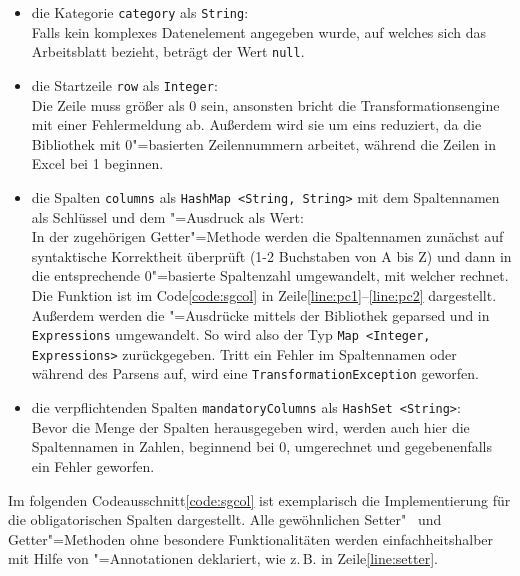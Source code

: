 \begin{itemize}
\item die Kategorie \texttt{category} als \texttt{String}:\\
Falls kein komplexes Datenelement angegeben wurde, auf welches sich das Arbeitsblatt bezieht, beträgt der Wert \texttt{null}. 
\item die Startzeile \texttt{row} als \texttt{Integer}:\\
Die Zeile muss größer als 0 sein, ansonsten bricht die Transformationsengine mit einer Fehlermeldung ab. Außerdem wird sie um eins reduziert, da die Bibliothek  mit 0"=basierten Zeilennummern arbeitet, während die Zeilen in Excel bei 1 beginnen. 
\item die Spalten \texttt{columns} als \texttt{HashMap <String, String>} mit dem Spaltennamen als Schlüssel und dem "=Ausdruck als Wert:\\
In der zugehörigen Getter"=Methode werden die Spaltennamen zunächst auf syntaktische Korrektheit überprüft (1-2 Buchstaben von A bis Z) und dann in die entsprechende 0"=basierte Spaltenzahl umgewandelt, mit welcher  rechnet. Die Funktion ist im Code\nbs\ref{code:sgcol} in Zeile\nbs\ref{line:pc1}--\nbs\ref{line:pc2} dargestellt. Außerdem werden die "=Ausdrücke mittels der Bibliothek  geparsed und in \texttt{Expressions} umgewandelt. So wird also der Typ \texttt{Map <Integer, Expressions>} zurückgegeben. Tritt ein Fehler im Spaltennamen oder während des  Parsens auf, wird eine \texttt{TransformationException} geworfen.
\item die verpflichtenden Spalten \texttt{mandatoryColumns} als \texttt{HashSet <String>}:\\
Bevor die Menge der Spalten herausgegeben wird, werden auch hier die Spaltennamen in Zahlen, beginnend bei 0, umgerechnet und gegebenenfalls ein Fehler geworfen.   
\end{itemize}
Im folgenden Codeausschnitt\nbs\ref{code:sgcol} ist exemplarisch die Implementierung für die obligatorischen Spalten dargestellt. Alle gewöhnlichen Setter"~ und Getter"=Methoden ohne besondere Funktionalitäten werden einfachheitshalber mit Hilfe von "=Annotationen deklariert, wie z.\,B. in Zeile\nbs\ref{line:setter}.
